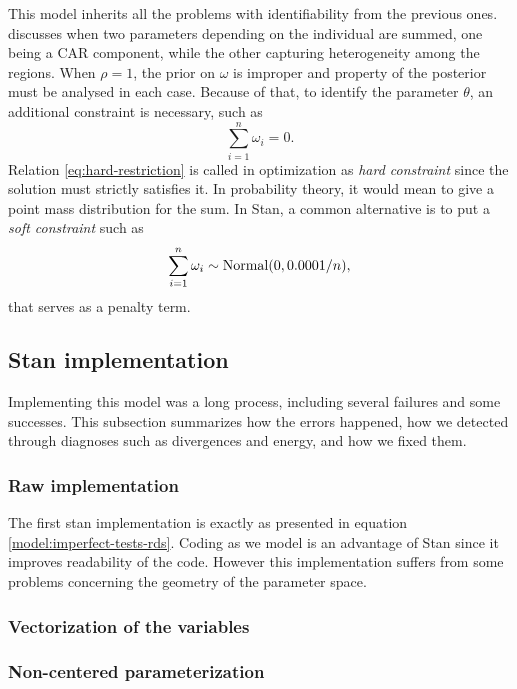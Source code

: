 This model inherits all the problems with identifiability from the previous
ones. \textcite[p. 3470]{xie2006measures} discusses when two parameters depending on the individual are
summed, one being a CAR component, while the other capturing heterogeneity
among the regions. When $\rho = 1$, the prior on $\omega$ is improper and
property of the posterior must be analysed in each case. Because of that, to
identify the parameter $\theta$, an additional constraint is necessary, such
as 
\begin{equation}
  \label{eq:hard-restriction}
  \sum_{i=1}^n \omega_i = 0.
\end{equation}
Relation \eqref{eq:hard-restriction} is called in optimization as {\em hard
constraint} since the solution must strictly satisfies it. In probability
theory, it would mean to give a point mass distribution for the sum.   
In Stan, a common alternative is to put a {\em soft constraint} such as
\begin{equation}
  \label{eq:soft-restriction}
  \sum_{i=1}^n \omega_i \sim \operatorname{Normal}(0, 0.0001/n), 
\end{equation}
that serves as a penalty term. 

\subsection{Stan implementation}

Implementing this model was a long process, including several failures and
some successes. This subsection summarizes how the errors happened, how we
detected through diagnoses such as divergences and energy, and how we fixed
them. 

\subsubsection*{Raw implementation}

The first stan implementation is exactly as presented in equation
\eqref{model:imperfect-tests-rds}. Coding as we model is an advantage of Stan 
since it improves readability of the code. However this implementation suffers from
some problems concerning the geometry of the parameter space. 

\subsubsection*{Vectorization of the variables}

\subsubsection*{Non-centered parameterization}

